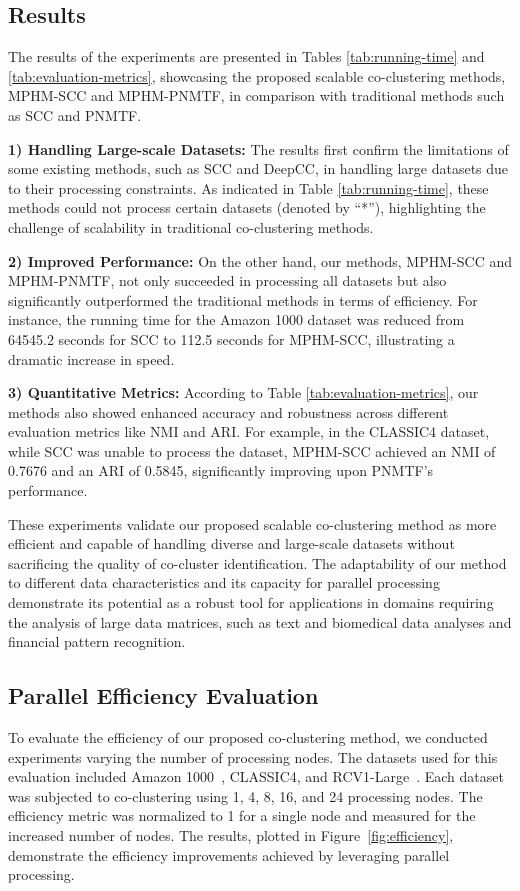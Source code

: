 \documentclass[journal]{IEEEtran}
\renewcommand{\cite}[1]{~\autocite{#1}}
\begin{document}
\subsection{Results}
The results of the experiments are presented in Tables \ref{tab:running-time} and \ref{tab:evaluation-metrics}, showcasing the proposed scalable co-clustering methods, MPHM-SCC and MPHM-PNMTF, in comparison with traditional methods such as SCC and PNMTF.

\textbf{1) Handling Large-scale Datasets:} The results first confirm the limitations of some existing methods, such as SCC and DeepCC, in handling large datasets due to their processing constraints. As indicated in Table \ref{tab:running-time}, these methods could not process certain datasets (denoted by ``*''), highlighting the challenge of scalability in traditional co-clustering methods.

\textbf{2) Improved Performance:} On the other hand, our methods, MPHM-SCC and MPHM-PNMTF, not only succeeded in processing all datasets but also significantly outperformed the traditional methods in terms of efficiency. For instance, the running time for the Amazon 1000 dataset was reduced from 64545.2 seconds for SCC to 112.5 seconds for MPHM-SCC, illustrating a dramatic increase in speed.

\textbf{3) Quantitative Metrics:} According to Table \ref{tab:evaluation-metrics}, our methods also showed enhanced accuracy and robustness across different evaluation metrics like NMI and ARI. For example, in the CLASSIC4 dataset, while SCC was unable to process the dataset, MPHM-SCC achieved an NMI of 0.7676 and an ARI of 0.5845, significantly improving upon PNMTF's performance.

These experiments validate our proposed scalable co-clustering method as more efficient and capable of handling diverse and large-scale datasets without sacrificing the quality of co-cluster identification. The adaptability of our method to different data characteristics and its capacity for parallel processing demonstrate its potential as a robust tool for applications in domains requiring the analysis of large data matrices, such as text and biomedical data analyses and financial pattern recognition.

\subsection{Parallel Efficiency Evaluation}
To evaluate the efficiency of our proposed co-clustering method, we conducted experiments varying the number of processing nodes. The datasets used for this evaluation included Amazon 1000\cite{ni2019JustifyingRecommendationsUsing}, CLASSIC4, and RCV1-Large\cite{lewis2004Rcv1NewBenchmark}. Each dataset was subjected to co-clustering using 1, 4, 8, 16, and 24 processing nodes. The efficiency metric was normalized to 1 for a single node and measured for the increased number of nodes. The results, plotted in Figure~\ref{fig:efficiency}, demonstrate the efficiency improvements achieved by leveraging parallel processing.
\end{document}
